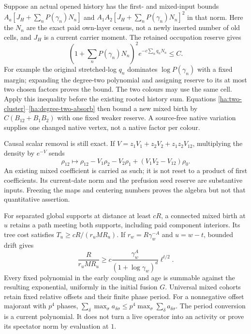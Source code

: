 Suppose an actual opened history has the first- and mixed-input bounds
$A_a[J_H+\sum_nP(\gamma_n)N_n]$ and
$A_1A_2[J_H+\sum_nP(\gamma_n)N_n]^2$ in that norm.  Here the $N_n$
are the exact paid own-layer census, not a newly inserted number of old
cells, and $J_H$ is a current carrier moment.  The retained occupation
reserve gives
\begin{equation}
 \left(1+\sum_nP(\gamma_n)N_n\right)^2
               e^{-c\sum_nq_nN_n}\leq C.
 \label{ha:degree-two-absorb}
\end{equation}
For example the original stretched-log $q_n$ dominates
$\log P(\gamma_n)$ with a fixed margin; expanding the degree-two
polynomial and assigning reserve to its at most two chosen factors
proves the bound.  The two colours may use the same cell.  Apply this
inequality before the existing rooted history sum.  Equations
\eqref{ha:two-cluster}--\eqref{ha:degree-two-absorb} then bound a new mixed
birth by $C(B_{12}+B_1B_2)$ with one fixed weaker reserve.  A source-free
native variation supplies one changed native vertex, not a native factor
per colour.

Causal scalar removal is still exact.  If
$V=z_1V_1+z_2V_2+z_1z_2V_{12}$, multiplying the density by $e^{-V}$ sends
\begin{equation}
 \rho_{12}\longmapsto\rho_{12}-V_1\rho_2-V_2\rho_1
                            +(V_1V_2-V_{12})\rho_0.
 \label{ha:two-scalar}
\end{equation}
An existing mixed coefficient is carried as such; it is not reset to a
product of first coefficients.  Its current-date norm and the prefusion
seed reserve are substantive inputs.  Freezing the maps and centering
numbers proves the algebra but not that quantitative assertion.

For separated global supports at distance at least $cR$, a connected
mixed birth at $u$ retains a path meeting both supports, including paid
component interiors.  Its tree cost satisfies
$T_u\geq cR/(r_uMR_u)$.  If
$r_w=R\gamma_w^{-A}$ and $u=w-t$, bounded drift gives
\begin{equation}
 \frac{R}{r_uMR_u}\geq
 c\frac{\gamma_w^A}{(1+\log\gamma_w)^d}\ell^{t/2}.
 \label{ha:early-path}
\end{equation}
Every fixed polynomial in the early coupling and age is summable against
the resulting exponential, uniformly in the initial fusion $G$.
Universal mixed cohorts retain fixed relative offsets and their finite
phase period.  For a nonnegative offset majorant with $p^4$ phases,
$\sum_\delta\max_\sigma a_{\delta\sigma}
\leq p^4\max_\sigma\sum_\delta a_{\delta\sigma}$.
The period conversion is a current polynomial.  It does not turn a live
operator into an activity or prove its spectator norm by evaluation at $1$.

